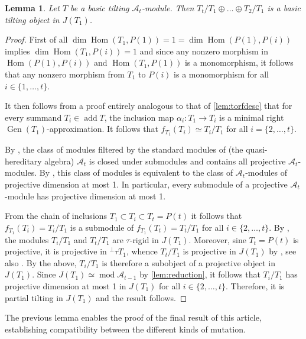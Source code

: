 \documentclass[10pt,twoside, a4paper,reqno]{amsart}
\DeclareMathOperator{\mods}{mod}
\DeclareMathOperator{\Hom}{Hom}
\DeclareMathOperator{\add}{add}
\DeclareMathOperator{\Gen}{Gen}
\newcommand{\A}{\mathscr{A}}
\newtheorem{lemma}[theorem]{Lemma}
\theoremstyle{definition}
\begin{document}
\begin{lemma}\label{lem:tiltreduction}
	Let $T$ be a basic tilting $\A_t$-module. Then $T_t/T_1 \oplus \dots \oplus T_2/T_1$ is a basic tilting object in $J(T_1)$. 
\end{lemma}
\begin{proof}
	First of all $\dim \Hom(T_1, P(1)) = 1 = \dim \Hom(P(1), P(i))$ implies $\dim \Hom(T_1, P(i)) = 1$ and since any nonzero morphism in $\Hom(P(1),P(i))$ and $\Hom(T_1, P(1))$ is a monomorphism, it follows that any nonzero morphism from $T_1$ to $P(i)$ is a monomorphism for all $i \in \{1, \dots, t\}$. 
	
	It then follows from a proof entirely analogous to that of \cref{lem:torfdesc} that for every summand $T_i \in \add T$, the inclusion map $\alpha_i: T_1 \to T_i $ is a minimal right $\Gen(T_1)$-approximation. It follows that $f_{T_1} (T_i) \simeq T_i/T_1$ for all $i=\{2,\dots, t\}$. 
	
	By \cite[Lem. 7.1]{DlabRingel1992}, the class of modules filtered by the standard modules of (the quasi-hereditary algebra) $\A_t$ is closed under submodules and contains all projective $\A_t$-modules. By \cite[Lem. 1]{BHRR1999}, this class of modules is equivalent to the class of $\A_t$-modules of projective dimension at most 1. In particular, every submodule of a projective $\A_t$-module has projective dimension at most 1. 
	
	From the chain of inclusions $T_1 \subset T_i \subset T_t = P(t)$ it follows that $f_{T_1}(T_i) = T_i/T_1$ is a submodule of $f_{T_1}(T_t) = T_t/T_1$ for all $i \in \{2, \dots, t\}$. By \cite[Prop. 4.5]{BuanMarsh2018t}, the modules $T_i/T_1$ and $T_t/T_1$ are $\tau$-rigid in $J(T_1)$. Moreover, sine $T_t= P(t)$ is projective, it is projective in ${}^\perp \tau T_1$, whence $T_t/T_1$ is projective in $J(T_1)$ by \cite[Prop. 3.14]{Jasso2015}, see also \cite[Lem. 4.9]{BuanMarsh2018t}. By the above, $T_i/T_1$ is therefore a subobject of a projective object in $J(T_1)$. Since $J(T_1) \simeq \mods \A_{t-1}$ by \cref{lem:reduction}, it follows that $T_i/T_1$ has projective dimension at most 1 in $J(T_1)$ for all $i \in \{2, \dots, t\}$. Therefore, it is partial tilting in $J(T_1)$ and the result follows.
\end{proof}


The previous lemma enables the proof of the final result of this article, establishing compatibility between the different kinds of mutation.
\end{document}
